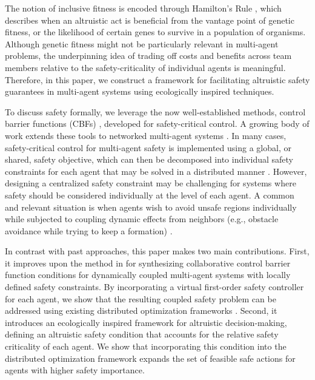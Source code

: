 \documentclass[letterpaper, 10 pt, conference]{ieeeconf}  %
\theoremstyle{plain}
\begin{document}
The notion of inclusive fitness is encoded through Hamilton's Rule \cite{hamilton1963evolution,butler2025hamilton,karam2025resource}, which describes when an altruistic act is beneficial from the vantage point of genetic fitness, or the likelihood of certain genes to survive in a population of organisms.  Although genetic fitness might not be particularly relevant in multi-agent problems, the underpinning idea of trading off costs and benefits across team members relative to the safety-criticality of individual agents is meaningful. Therefore, in this paper, we construct a framework for facilitating altruistic safety guarantees in multi-agent systems using ecologically inspired techniques.

To discuss safety formally, we leverage the now well-established methods, control barrier functions (CBFs) \cite{ames2017tac}, developed for safety-critical control. A growing body of work extends these tools to networked multi-agent systems \cite{chen2020safety,xiao2025continuous,mestres2023distributed}. In many cases, safety-critical control for multi-agent safety is implemented using a global, or shared, safety objective, which can then be decomposed into individual safety constraints for each agent that may be solved in a distributed manner \cite{chen2020safety,jagtap2020compositional}. However, designing a centralized safety constraint may be challenging for systems where safety should be considered individually at the level of each agent. A common and relevant situation is when agents wish to avoid unsafe regions individually while subjected to coupling dynamic effects from neighbors (e.g., obstacle avoidance while trying to keep a formation) \cite{butler2024collaborative_ecc, butler2024collaborativesafety}.  

In contrast with past approaches, this paper makes two main contributions. First, it improves upon the method in \cite{butler2024collaborativesafety} for synthesizing collaborative control barrier function conditions for dynamically coupled multi-agent systems with locally defined safety constraints. By incorporating a virtual first-order safety controller for each agent, we show that the resulting coupled safety problem can be addressed using existing distributed optimization frameworks \cite{xiao2025continuous}. Second, it introduces an ecologically inspired framework for altruistic decision-making, defining an altruistic safety condition that accounts for the relative safety criticality of each agent. We show that incorporating this condition into the distributed optimization framework expands the set of feasible safe actions for agents with higher safety importance.
\end{document}
